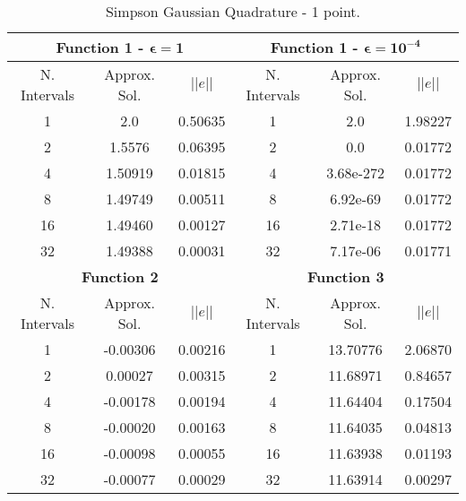 \begin{table}[H]
    \centering
    \caption{Simpson Gaussian Quadrature - 1 point.}
    \begin{tabular}{ccc|ccc}
    \hline
    \multicolumn{3}{c}{\textbf{Function 1  -} $\bm{\epsilon = 1}$} & \multicolumn{3}{c}{\textbf{Function 1 -} $\bm{\epsilon = 10^{-4}}$} \\ \hline
    N. Intervals & Approx. Sol. & $|| e ||$ & N. Intervals & Approx. Sol. & $|| e ||$ \\ \hline
    1 & 2.0 & 0.50635 & 1 & 2.0 & 1.98227 \\
    2 & 1.5576 & 0.06395 & 2 & 0.0 & 0.01772 \\
    4 & 1.50919 & 0.01815 & 4 & 3.68e-272 & 0.01772 \\
    8 & 1.49749 & 0.00511 & 8 & 6.92e-69 & 0.01772 \\
    16 & 1.49460 & 0.00127 &  16 & 2.71e-18 & 0.01772 \\
    32 & 1.49388 & 0.00031 & 32 & 7.17e-06 & 0.01771 \\ \hline
    \multicolumn{3}{c}{\textbf{Function 2}} & \multicolumn{3}{c}{\bf{Function 3}} \\ \hline
    N. Intervals & Approx. Sol. & $|| e ||$ & N. Intervals & Approx. Sol. & $|| e ||$ \\ \hline
    1 & -0.00306 & 0.00216 & 1 & 13.70776 & 2.06870\\
    2 & 0.00027& 0.00315 & 2 & 11.68971 & 0.84657\\
    4 & -0.00178 & 0.00194 & 4 & 11.64404 & 0.17504\\
    8 & -0.00020 & 0.00163 & 8 & 11.64035 & 0.04813\\
    16 & -0.00098 & 0.00055 & 16 & 11.63938 & 0.01193\\
    32 & -0.00077 & 0.00029 & 32 & 11.63914& 0.00297 \\\hline
    \end{tabular}
\end{table}

